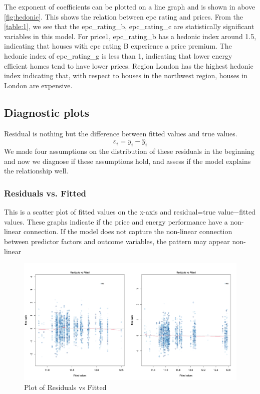 \documentclass[12pt]{article}
\begin{document}
The exponent of coefficients can be plotted on a line graph and is shown in above \autoref{fig:hedonic}. This shows the relation between  \acrshort{epc} rating and prices. From the \autoref{table:1}, we see that the epc\_rating\_b, epc\_rating\_c are statistically significant variables in this model. For \gls{price1}, epc\_rating\_b has a hedonic index around 1.5, indicating that houses with \acrshort{epc} rating B experience a price premium. The hedonic index of epc\_rating\_g is less than 1, indicating that lower energy efficient homes tend to have lower prices. Region London has the highest hedonic index indicating that, with respect to houses in the northwest region, houses in London are expensive.

\subsection{Diagnostic plots}
\label{diag_plot}
Residual is nothing but the difference between fitted values and true values. $$\varepsilon_i=y_i-\hat y_i$$ We made four assumptions on the distribution of these residuals in the beginning and now we diagnose if these assumptions hold, and assess if the model explains the relationship well.
\subsubsection{Residuals vs. Fitted}
This is a scatter plot of fitted values on the x-axis and residual=true value$-$fitted values. These graphs indicate if the price and energy performance have a non-linear connection.
If the model does not capture the non-linear connection between predictor factors and outcome variables, the pattern may appear non-linear

\begin{figure}[H]
    \centering
    \includegraphics[width=18cm]{3.3 images/3.3.1plot.png}
    \caption{Plot of Residuals vs Fitted}
    \label{fig:residue}
\end{figure}
\end{document}
